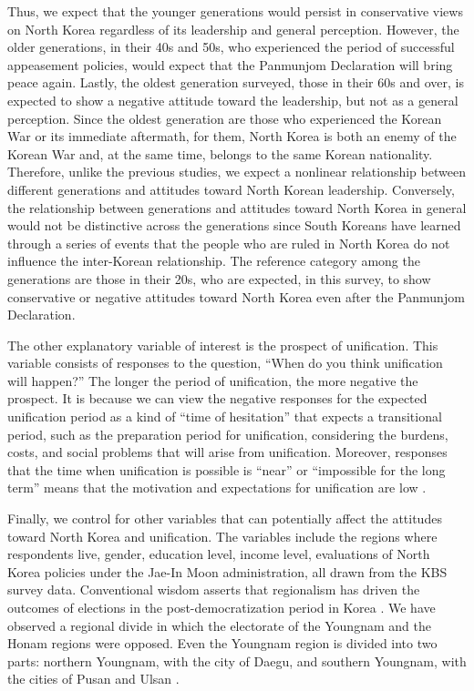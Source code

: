 \documentclass[letterpaper,9pt,twocolumn,twoside,]{pinp}
\begin{document}
Thus, we expect that the younger generations would persist in
conservative views on North Korea regardless of its leadership and
general perception. However, the older generations, in their 40s and
50s, who experienced the period of successful appeasement policies,
would expect that the Panmunjom Declaration will bring peace again.
Lastly, the oldest generation surveyed, those in their 60s and over, is
expected to show a negative attitude toward the leadership, but not as a
general perception. Since the oldest generation are those who
experienced the Korean War or its immediate aftermath, for them, North
Korea is both an enemy of the Korean War and, at the same time, belongs
to the same Korean nationality. Therefore, unlike the previous studies,
we expect a nonlinear relationship between different generations and
attitudes toward North Korean leadership. Conversely, the relationship
between generations and attitudes toward North Korea in general would
not be distinctive across the generations since South Koreans have
learned through a series of events that the people who are ruled in
North Korea do not influence the inter-Korean relationship. The
reference category among the generations are those in their 20s, who are
expected, in this survey, to show conservative or negative attitudes
toward North Korea even after the Panmunjom Declaration.

The other explanatory variable of interest is the prospect of
unification. This variable consists of responses to the question, ``When
do you think unification will happen?'' The longer the period of
unification, the more negative the prospect. It is because we can view
the negative responses for the expected unification period as a kind of
``time of hesitation'' that expects a transitional period, such as the
preparation period for unification, considering the burdens, costs, and
social problems that will arise from unification. Moreover, responses
that the time when unification is possible is ``near'' or ``impossible
for the long term'' means that the motivation and expectations for
unification are low \citep[82]{Jeong2013}.

Finally, we control for other variables that can potentially affect the
attitudes toward North Korea and unification. The variables include the
regions where respondents live, gender, education level, income level,
evaluations of North Korea policies under the Jae-In Moon
administration, all drawn from the KBS survey data. Conventional wisdom
asserts that regionalism has driven the outcomes of elections in the
post-democratization period in Korea \citep{Kim2008}. We have observed a
regional divide in which the electorate of the Youngnam and the Honam
regions were opposed. Even the Youngnam region is divided into two
parts: northern Youngnam, with the city of Daegu, and southern Youngnam,
with the cities of Pusan and Ulsan \citep{Kang2000, Kim2010, Yoon2012}.
\end{document}
